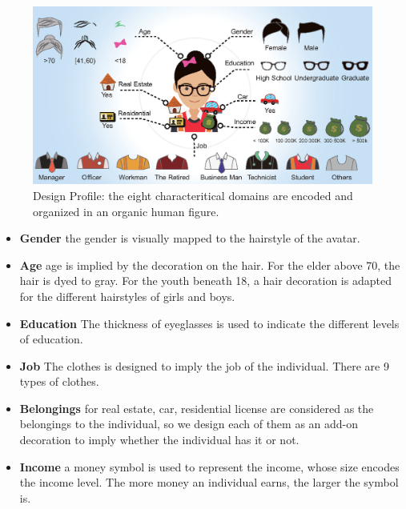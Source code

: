 \begin{figure}[htb!]
 \centering %
 \includegraphics[width=\columnwidth]{pictures/design_profile}
 \caption{Design Profile: the eight characteritical domains are encoded and organized in an organic human figure.}
 \label{fig:design_profile}
\end{figure}



\begin{itemize}
\item \textbf{Gender} the gender is visually mapped to the hairstyle of the avatar.
\item \textbf{Age} age is implied by the decoration on the hair. For the elder above 70, the hair is dyed to gray. For the youth beneath 18, a hair decoration is adapted for the different hairstyles of girls and boys.
\item \textbf{Education} The thickness of eyeglasses is used to indicate the different levels of education.
\item \textbf{Job} The clothes is designed to imply the job of the individual. There are 9 types of clothes.
\item \textbf{Belongings} for real estate, car, residential license are considered as the belongings to the individual, so we design each of them as an add-on decoration to imply whether the individual has it or not.
\item \textbf{Income} a money symbol is used to represent the income, whose size encodes the income level. The more money an individual earns, the larger the symbol is.
\end{itemize}

